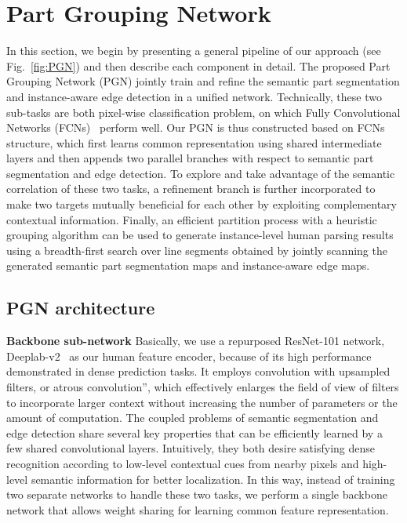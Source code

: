 \documentclass[runningheads]{llncs}
\begin{document}
\section{Part Grouping Network}
In this section, we begin by presenting a general pipeline of our approach (see Fig.~\ref{fig:PGN}) and then describe each component in detail. The proposed Part Grouping Network (PGN) jointly train and refine the semantic part segmentation and instance-aware edge detection in a unified network. Technically, these two sub-tasks are both pixel-wise classification problem, on which Fully Convolutional Networks (FCNs)~\cite{long2014fully} perform well. Our PGN is thus constructed based on FCNs structure, which first learns common representation using shared intermediate layers and then appends two parallel branches with respect to semantic part segmentation and edge detection. To explore and take advantage of the semantic correlation of these two tasks, a refinement branch is further incorporated to make two targets mutually beneficial for each other by exploiting complementary contextual information. Finally, an efficient partition process with a heuristic grouping algorithm can be used to generate instance-level human parsing results using a breadth-first search over line segments obtained by jointly scanning the generated semantic part segmentation maps and instance-aware edge maps.

\subsection{PGN architecture}

\textbf{Backbone sub-network}
Basically, we use a repurposed ResNet-101 network, Deeplab-v2~\cite{chen2016deeplab} as our human feature encoder, because of its high performance demonstrated in dense prediction tasks. It employs convolution with upsampled filters, or atrous convolution”, which effectively enlarges the field of view of filters to incorporate larger context without increasing the number of parameters or the amount of computation. The coupled problems of semantic segmentation and edge detection share several key properties that can be efficiently learned by a few shared convolutional layers. Intuitively, they both desire satisfying dense recognition according to low-level contextual cues from nearby pixels and high-level semantic information for better localization. In this way, instead of training two separate networks to handle these two tasks, we perform a single backbone network that allows weight sharing for learning common feature representation.
\end{document}
